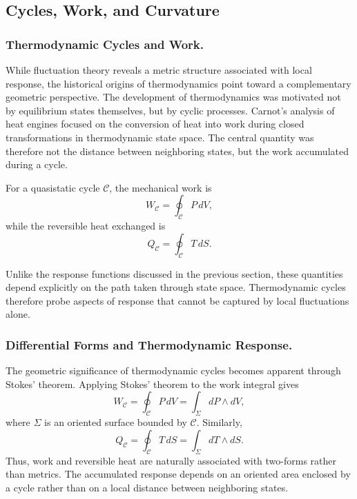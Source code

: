 \subsection{Cycles, Work, and Curvature}

\subsubsection{Thermodynamic Cycles and Work.}

While fluctuation theory reveals a metric structure associated with local response, the historical origins of thermodynamics point toward a complementary geometric perspective. The development of thermodynamics was motivated not by equilibrium states themselves, but by cyclic processes. Carnot’s analysis of heat engines focused on the conversion of heat into work during closed transformations in thermodynamic state space. The central quantity was therefore not the distance between neighboring states, but the work accumulated during a cycle.

For a quasistatic cycle \(\mathcal{C}\), the mechanical work is
\begin{equation}
W_\mathcal{C}=\oint_\mathcal{C} P\,dV,
\end{equation}
while the reversible heat exchanged is
\begin{equation}
Q_\mathcal{C}=\oint_\mathcal{C} T\,dS.
\end{equation}

Unlike the response functions discussed in the previous section, these quantities depend explicitly on the path taken through state space. Thermodynamic cycles therefore probe aspects of response that cannot be captured by local fluctuations alone.



\subsubsection{Differential Forms and Thermodynamic Response.}

The geometric significance of thermodynamic cycles becomes apparent through Stokes’ theorem. Applying Stokes’ theorem to the work integral gives
\begin{equation}
W_\mathcal{C}
=
\oint_\mathcal{C} P\,dV
=
\int_{\Sigma}
dP\wedge dV,
\end{equation}
where \(\Sigma\) is an oriented surface bounded by \(\mathcal{C}\). Similarly,
\begin{equation}
Q_\mathcal{C}
=
\oint_\mathcal{C} T\,dS
=
\int_{\Sigma}
dT\wedge dS.
\end{equation}
Thus, work and reversible heat are naturally associated with two-forms rather than metrics. The accumulated response depends on an oriented area enclosed by a cycle rather than on a local distance between neighboring states.

